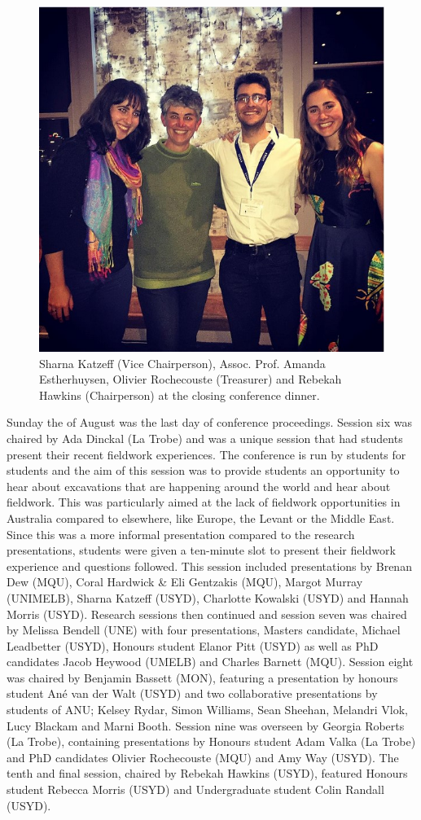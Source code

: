 \begin{figure}
	\includegraphics[width=.6\linewidth]{figures/NASC_Fig4}
	\centering
	\caption{Sharna Katzeff (Vice Chairperson), Assoc. Prof. Amanda Estherhuysen, Olivier Rochecouste (Treasurer) and Rebekah Hawkins (Chairperson) at the closing conference dinner.}
	\label{fig:NASC_Fig4}
\end{figure}


Sunday the  of August was the last day of conference proceedings. Session six was chaired by Ada Dinckal (La Trobe) and was a unique session that had students present their recent fieldwork experiences. The conference is run by students for students and the aim of this session was to provide students an opportunity to hear about excavations that are happening around the world and hear about fieldwork. This was particularly aimed at the lack of fieldwork opportunities in Australia compared to elsewhere, like Europe, the Levant or the Middle East. Since this was a more informal presentation compared to the research presentations, students were given a ten-minute slot to present their fieldwork experience and questions followed. This session included presentations by Brenan Dew (MQU), Coral Hardwick \& Eli Gentzakis (MQU), Margot Murray (UNIMELB), Sharna Katzeff (USYD), Charlotte Kowalski (USYD) and Hannah Morris (USYD). Research sessions then continued and session seven was chaired by Melissa Bendell (UNE) with four presentations, Masters candidate, Michael Leadbetter (USYD), Honours student Elanor Pitt (USYD) as well as PhD candidates Jacob Heywood (UMELB) and Charles Barnett (MQU). Session eight was chaired by Benjamin Bassett (MON), featuring a presentation by honours student Ané van der Walt (USYD) and two collaborative presentations by students of ANU; Kelsey Rydar, Simon Williams, Sean Sheehan, Melandri Vlok, Lucy Blackam and Marni Booth. Session nine was overseen by Georgia Roberts (La Trobe), containing presentations by Honours student Adam Valka (La Trobe) and PhD candidates Olivier Rochecouste (MQU) and Amy Way (USYD). The tenth and final session, chaired by Rebekah Hawkins (USYD), featured Honours student Rebecca Morris (USYD) and Undergraduate student Colin Randall (USYD). 

